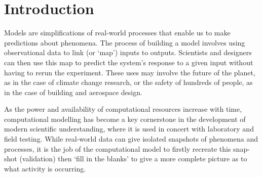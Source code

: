 \section{Introduction}

Models are simplifications of real-world processes that enable us to make
predictions about phenomena. The process of building a model involves using
observational data to link (or ‘map’) inputs to outputs. Scientists and
designers can then use this map to predict the system’s response to a given
input without having to rerun the experiment. These uses may involve the future
of the planet, as in the case of climate change research, or the safety of
hundreds of people, as in the case of building and aerospace design.

As the power and availability of computational resources increase with time,
computational modelling has become a key cornerstone in the development of
modern scientific understanding, where it is used in concert with laboratory
and field testing. While real-world data can give isolated snapshots of
phenomena and processes, it is the job of the computational model to firstly
recreate this snap-shot (validation) then ‘fill in the blanks’ to give a more
complete picture as to what activity is occurring.
